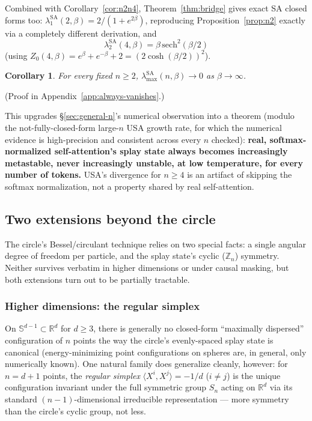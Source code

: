 \documentclass[11pt]{article}
\newtheorem{corollary}[theorem]{Corollary}
\begin{document}
Combined with Corollary~\ref{cor:n2n4}, Theorem~\ref{thm:bridge} gives exact SA closed forms too: $\lambda_1^{\mathrm{SA}}(2,\beta)=2/(1+e^{2\beta})$, reproducing Proposition~\ref{prop:n2} exactly via a completely different derivation, and
\begin{equation}
    \lambda_2^{\mathrm{SA}}(4,\beta) = \beta\,\mathrm{sech}^2(\beta/2)
    \label{eq:sa-n4}
\end{equation}
(using $Z_0(4,\beta)=e^\beta+e^{-\beta}+2=(2\cosh(\beta/2))^2$).

\begin{corollary}
\label{cor:always-vanishes}
For every fixed $n\ge2$, $\lambda_{\max}^{\mathrm{SA}}(n,\beta)\to0$ as $\beta\to\infty$.
\end{corollary}
(Proof in Appendix~\ref{app:always-vanishes}.)

This upgrades \S\ref{sec:general-n}'s numerical observation into a theorem (modulo the not-fully-closed-form large-$n$ USA growth rate, for which the numerical evidence is high-precision and consistent across every $n$ checked): \textbf{real, softmax-normalized self-attention's splay state always becomes increasingly metastable, never increasingly unstable, at low temperature, for every number of tokens.} USA's divergence for $n\ge4$ is an artifact of skipping the softmax normalization, not a property shared by real self-attention.

\subsection{Two extensions beyond the circle}
\label{sec:extensions}

The circle's Bessel/circulant technique relies on two special facts: a single angular degree of freedom per particle, and the splay state's cyclic ($\mathbb{Z}_n$) symmetry. Neither survives verbatim in higher dimensions or under causal masking, but both extensions turn out to be partially tractable.

\subsubsection{Higher dimensions: the regular simplex}
\label{sec:higher-dim}

On $\mathbb{S}^{d-1}\subset\mathbb{R}^d$ for $d\ge3$, there is generally no closed-form ``maximally dispersed'' configuration of $n$ points the way the circle's evenly-spaced splay state is canonical (energy-minimizing point configurations on spheres are, in general, only numerically known). One natural family does generalize cleanly, however: for $n=d+1$ points, the \emph{regular simplex} $\langle X^i,X^j\rangle=-1/d$ ($i\ne j$) is the unique configuration invariant under the full symmetric group $S_n$ acting on $\mathbb{R}^d$ via its standard $(n{-}1)$-dimensional irreducible representation --- more symmetry than the circle's cyclic group, not less.
\end{document}
